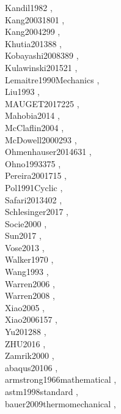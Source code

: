 \documentclass{article}
\begin{document}
Kandil1982 \cite{Kandil1982}, \\
Kang20031801 \cite{Kang20031801}, \\
Kang2004299 \cite{Kang2004299}, \\
Khutia201388 \cite{Khutia201388}, \\
Kobayashi2008389 \cite{Kobayashi2008389}, \\
Kulawinski201521 \cite{Kulawinski201521}, \\
Lemaitre1990Mechanics \cite{Lemaitre1990Mechanics}, \\
Liu1993 \cite{Liu1993}, \\
MAUGET2017225 \cite{MAUGET2017225}, \\
Mahobia2014 \cite{Mahobia2014}, \\
McClaflin2004 \cite{McClaflin2004}, \\
McDowell2000293 \cite{McDowell2000293}, \\
Ohmenhauser2014631 \cite{Ohmenhauser2014631}, \\
Ohno1993375 \cite{Ohno1993375}, \\
Pereira2001715 \cite{Pereira2001715}, \\
Pol1991Cyclic \cite{Pol1991Cyclic}, \\
Safari2013402 \cite{Safari2013402}, \\
Schlesinger2017 \cite{Schlesinger2017}, \\
Socie2000 \cite{Socie2000}, \\
Sun2017 \cite{Sun2017}, \\
Vose2013 \cite{Vose2013}, \\
Walker1970 \cite{Walker1970}, \\
Wang1993 \cite{Wang1993}, \\
Warren2006 \cite{Warren2006}, \\
Warren2008 \cite{Warren2008}, \\
Xiao2005 \cite{Xiao2005}, \\
Xiao2006157 \cite{Xiao2006157}, \\
Yu201288 \cite{Yu201288}, \\
ZHU2016 \cite{ZHU2016}, \\
Zamrik2000 \cite{Zamrik2000}, \\
abaqus20106 \cite{abaqus20106}, \\
armstrong1966mathematical \cite{armstrong1966mathematical}, \\
astm1998standard \cite{astm1998standard}, \\
bauer2009thermomechanical \cite{bauer2009thermomechanical}, \\
\end{document}
